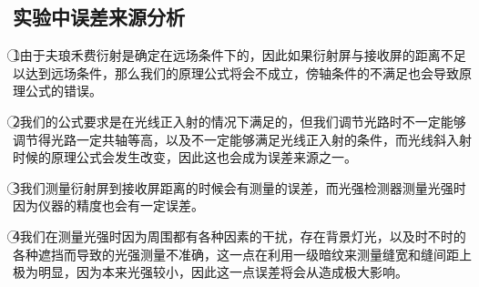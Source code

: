 \documentclass[a4 paper,12pt]{article}
\begin{document}
\subsection{实验中误差来源分析}
\textcircled{1}由于夫琅禾费衍射是确定在远场条件下的，因此如果衍射屏与接收屏的距离不足以达到远场条件，那么我们的原理公式将会不成立，傍轴条件的不满足也会导致原理公式的错误。
\par \textcircled{2}我们的公式要求是在光线正入射的情况下满足的，但我们调节光路时不一定能够调节得光路一定共轴等高，以及不一定能够满足光线正入射的条件，而光线斜入射时候的原理公式会发生改变，因此这也会成为误差来源之一。
\par \textcircled{3}我们测量衍射屏到接收屏距离的时候会有测量的误差，而光强检测器测量光强时因为仪器的精度也会有一定误差。
\par \textcircled{4}我们在测量光强时因为周围都有各种因素的干扰，存在背景灯光，以及时不时的各种遮挡而导致的光强测量不准确，这一点在利用一级暗纹来测量缝宽和缝间距上极为明显，因为本来光强较小，因此这一点误差将会从造成极大影响。
\end{document}
